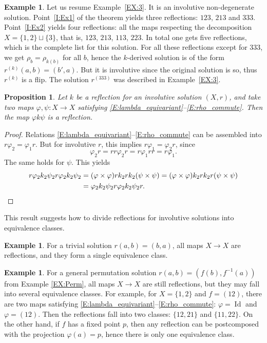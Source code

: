 \documentclass{amsart}
\newcommand{\Id}{\operatorname{Id}}
\theoremstyle{plain}
\newtheorem{pro}[thm]{Proposition}
\theoremstyle{definition}
\newtheorem{exa}[thm]{Example}
\theoremstyle{remark}
\begin{document}
\begin{exa}\label{EX:3bis}
Let us resume Example~\ref{EX:3}. It is an involutive non-degenerate solution. Point~\ref{I:Ex1} of the theorem yields three reflections: $123$, $213$ and $333$. Point~\ref{I:Ex2} yields four reflections: all the maps respecting the decomposition $X=\{1,2\}\sqcup \{3\}$, that is, $123$, $213$, $113$, $223$. In total one gets five reflections, which is the complete list for this solution. For all these reflections except for $333$, we get $\rho_b=\rho_{k(b)}$ for all $b$, hence the $k$-derived solution is of the form $r^{(k)}(a,b)=(b',a)$. But it is involutive since the original solution is so, thus $r^{(k)}$ is a flip. The solution $r^{(333)}$ was described in Example~\ref{EX:3}. 
\end{exa}

\begin{pro}\label{P:InvolEqClasses}
Let $k$ be a reflection for an involutive solution $(X,r)$, and take two maps $\varphi,\psi \colon X \to X$ satisfying \eqref{E:lambda_equivariant}--\eqref{E:rho_commute}. Then the map $\varphi k \psi$ is a reflection.
\end{pro}

\begin{proof}
Relations \eqref{E:lambda_equivariant}--\eqref{E:rho_commute} can be assembled into 
$r\varphi _2=\varphi _1r$. But for involutive $r$, this implies $r\varphi _1=\varphi _2r$, since
\[\varphi _2r=rr\varphi _2r=r\varphi _1rr=r\varphi _1.\]
The same holds for $\psi$. This yields
\begin{align*}
r \varphi_2 k_2 \psi_2 r \varphi_2 k_2 \psi_2 &=(\varphi \times \varphi) rk_2rk_2 (\psi \times \psi) = (\varphi \times \varphi) k_2rk_2r (\psi \times \psi)\\
& =\varphi_2 k_2 \psi_2 r \varphi_2 k_2 \psi_2 r.\qedhere
\end{align*}
\end{proof}

This result suggests how to divide reflections for involutive solutions into equivalence classes.

\begin{exa}
For a trivial solution $r(a,b)=(b,a)$, all maps $X \to X$ are reflections, and they form a single equivalence class.
\end{exa}

\begin{exa}\label{EX:Permbis}
For a general permutation solution $r(a,b)=(f(b),f^{-1}(a))$ from Example \ref{EX:Perm}, all maps $X \to X$ are still reflections, but they may fall into several equivalence classes. For example, for $X=\{1,2\}$ and $f=(12)$, there are two maps satisfying \eqref{E:lambda_equivariant}--\eqref{E:rho_commute}: $\varphi=\Id$ and $\varphi=(12)$. Then the reflections fall into two classes: $\{12,21\}$ and $\{11,22\}$. On the other hand, if $f$ has a fixed point $p$, then any reflection can be postcomposed with the projection $\varphi(a)=p$, hence there is only one equivalence class.
\end{exa}
\end{document}
